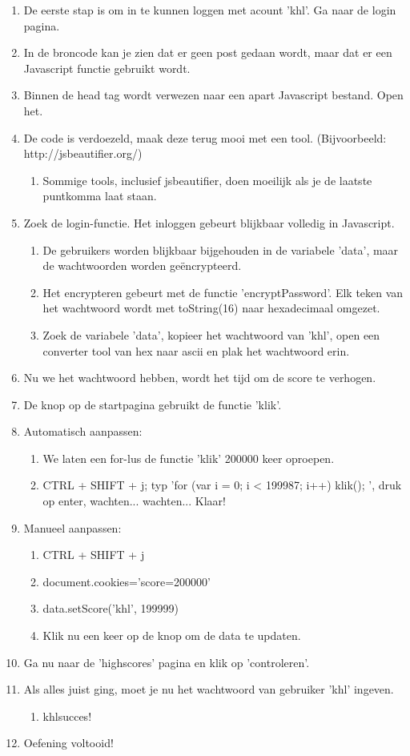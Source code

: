 \begin{enumerate}
  \item De eerste stap is om in te kunnen loggen met acount 'khl'. Ga naar de login pagina.
  \item In de broncode kan je zien dat er geen post gedaan wordt, maar dat er een Javascript functie gebruikt wordt.
  \item Binnen de head tag wordt verwezen naar een apart Javascript bestand. Open het.
  \item De code is verdoezeld, maak deze terug mooi met een tool. (Bijvoorbeeld: http://jsbeautifier.org/)
  	\begin{enumerate}
  	\item Sommige tools, inclusief jsbeautifier, doen moeilijk als je de laatste puntkomma laat staan.
  	\end{enumerate}
  \item Zoek de login-functie. Het inloggen gebeurt blijkbaar volledig in Javascript.
  	\begin{enumerate}
  	\item De gebruikers worden blijkbaar bijgehouden in de variabele 'data', maar de wachtwoorden worden geëncrypteerd.
  	\item Het encrypteren gebeurt met de functie 'encryptPassword'. Elk teken van het wachtwoord wordt met toString(16) naar hexadecimaal omgezet.
	\item Zoek de variabele 'data', kopieer het wachtwoord van 'khl', open een converter tool van hex naar ascii en plak het wachtwoord erin.
  	\end{enumerate}
  \item Nu we het wachtwoord hebben, wordt het tijd om de score te verhogen.
  \item De knop op de startpagina gebruikt de functie 'klik'. 
  \item Automatisch aanpassen:
  \begin{enumerate}
  \item We laten een for-lus de functie 'klik' 200000 keer oproepen.
  \item CTRL + SHIFT + j; typ 'for (var i = 0; i < 199987; i++) { klik(); }', druk op enter, wachten... wachten... Klaar!
  	\end{enumerate}
  \item Manueel aanpassen:
  	\begin{enumerate}
  	\item CTRL + SHIFT + j
  	\item document.cookies='score=200000'
  	\item data.setScore('khl', 199999)
  	\item Klik nu een keer op de knop om de data te updaten.
  	\end{enumerate}
  \item Ga nu naar de 'highscores' pagina en klik op 'controleren'.
  \item Als alles juist ging, moet je nu het wachtwoord van gebruiker 'khl' ingeven.
    	\begin{enumerate}
 		\item khlsucces!
 		\end{enumerate}
  \item Oefening voltooid!  
\end{enumerate}
